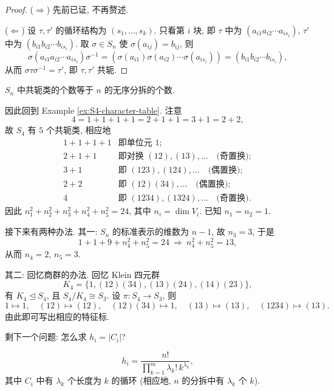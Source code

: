 \begin{proof}
($\Rightarrow$) 先前已证, 不再赘述.

($\Leftarrow$) 设 $\tau,\tau'$ 的循环结构为 $(s_1,\dots,s_k)$. 只看第 $i$ 块, 即
$\tau$ 中为 $(a_{i1}a_{i2}\cdots a_{is_i})$, $\tau'$ 中为 $(b_{i1}b_{i2}\cdots b_{is_i})$.
取 $\sigma\in S_n$ 使 $\sigma(a_{ij})=b_{ij}$, 则
\[
  \sigma(a_{i1}a_{i2}\cdots a_{is_i})\sigma^{-1}
  =(\sigma(a_{i1})\sigma(a_{i2})\cdots\sigma(a_{is_i}))
  =(b_{i1}b_{i2}\cdots b_{is_i}),
\]
从而 $\sigma\tau\sigma^{-1}=\tau'$, 即 $\tau,\tau'$ 共轭.
\end{proof}

\begin{corollary}\label{cor:conj-classes-partitions}
$S_n$ 中共轭类的个数等于 $n$ 的无序分拆的个数.
\end{corollary}

因此回到 Example \ref{ex:S4-character-table}. 注意
\[
  4=1+1+1+1=2+1+1=3+1=2+2,
\]
故 $S_4$ 有 $5$ 个共轭类, 相应地
\[
\begin{array}{ll}
  1+1+1+1 & \text{即单位元 } 1;\\
  2+1+1 & \text{即对换 } (12),(13),\dots \quad\text{(奇置换)};\\
  3+1 & \text{即 } (123),(124),\dots \quad\text{(偶置换)};\\
  2+2 & \text{即 } (12)(34),\dots \quad\text{(偶置换)};\\
  4 & \text{即 } (1234),(1324),\dots \quad\text{(奇置换)}.
\end{array}
\]
因此 $n_1^2+n_2^2+n_3^2+n_4^2+n_5^2=24$, 其中 $n_i=\dim V_i$. 已知 $n_1=n_2=1$.

接下来有两种办法. 其一: $S_n$ 的标准表示的维数为 $n-1$, 故 $n_3=3$, 于是
\[
  1+1+9+n_4^2+n_5^2=24\ \Longrightarrow\ n_4^2+n_5^2=13,
\]
从而 $n_4=2$, $n_5=3$.

其二: 回忆商群的办法. 回忆 Klein 四元群
\[
  K_4=\{1,(12)(34),(13)(24),(14)(23)\},
\]
有 $K_4\trianglelefteq S_4$, 且 $S_4/K_4\cong S_3$. 设 $\pi\colon S_4\to S_3$, 则
\[
  1\mapsto1,\quad (12)\mapsto(12),\quad (12)(34)\mapsto1,\quad
  (13)\mapsto(13),\quad (1234)\mapsto(13).
\]
由此即可写出相应的特征标.

剩下一个问题: 怎么求 $h_i=|C_i|$?

\begin{theorem}\label{thm:class-size}
\[
  h_i=\frac{n!}{\prod_{k=1}^{m}\lambda_k!\,k^{\lambda_k}},
\]
其中 $C_i$ 中有 $\lambda_k$ 个长度为 $k$ 的循环 (相应地, $n$ 的分拆中有
$\lambda_k$ 个 $k$).
\end{theorem}

